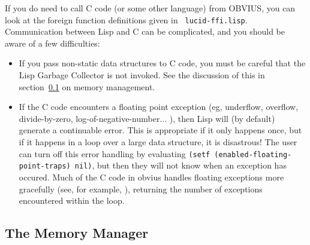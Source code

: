 If you do need to call C code (or some other language) from OBVIUS,
you can look at the foreign function definitions given in {\tt
lucid-ffi.lisp}.  Communication between Lisp and C can be complicated,
and you should  be aware of a few difficulties:
\begin{itemize}
\item If you pass non-static data structures to C code, you must be
careful that the Lisp Garbage Collector is not invoked.  See the
discussion of this in section~\ref{sec:using-memory} on memory
management.
\item If the C code encounters a floating point exception (eg, underflow,
overflow, divide-by-zero, log-of-negative-number... ), then Lisp
will (by default) generate a continuable error.  This is appropriate
if it only happens once, but if it happens in a loop over a large data
structure, it is disastrous!  The user can turn off this error
handling by evaluating {\tt (setf (enabled-floating-point-traps)
nil)}, but then they will not know when an exception has occured.
Much of the C code in obvius handles floating exceptions more
gracefully (see, for example, ), returning the
number of exceptions encountered within the loop.
\end{itemize}

\subsection{The Memory Manager}
\label{sec:using-memory}

